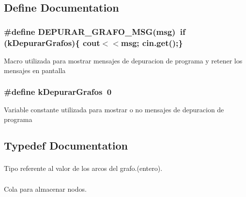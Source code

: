 \subsection{Define Documentation}
\subsubsection{\setlength{\rightskip}{0pt plus 5cm}\#define DEPURAR\_\-GRAFO\_\-MSG(msg)~if (kDepurarGrafos)\{ cout$<$$<$msg; cin.get();\}}\label{grafo_8h_9cb09aaf7c006d88cdb669d68c9ae7cf}


Macro utilizada para mostrar mensajes de depuracion de programa y retener los mensajes en pantalla 
\subsubsection{\setlength{\rightskip}{0pt plus 5cm}\#define kDepurarGrafos~0}\label{grafo_8h_fa8a7967855e3d2edac83a77459ac60e}


Variable constante utilizada para mostrar o no mensajes de depuracion de programa 

\subsection{Typedef Documentation}
\subsubsection{}\label{grafo_8h_100ccbbce021b9022905e74b443960e3}


Tipo referente al valor de los arcos del grafo.(entero). 

\subsubsection{}\label{grafo_8h_f3cc000f88d2566ca33dd725b2d7659f}


Cola para almacenar nodos. 


